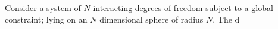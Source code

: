 Consider a system of $N$ interacting degrees of freedom subject to a global constraint; lying on an $N$ dimensional sphere of radius $N$. The d